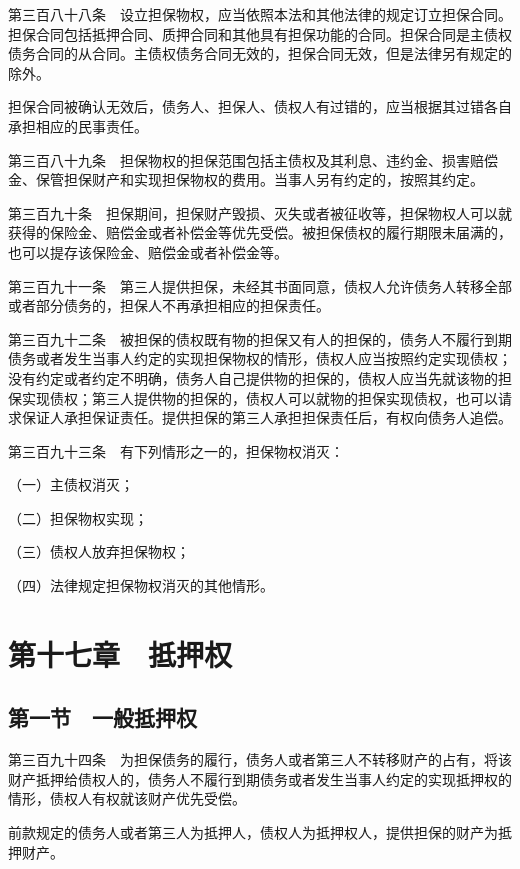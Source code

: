 \documentclass[UTF8,12pt,a4paper]{ctexbook}
\begin{document}
第三百八十八条　设立担保物权，应当依照本法和其他法律的规定订立担保合同。担保合同包括抵押合同、质押合同和其他具有担保功能的合同。担保合同是主债权债务合同的从合同。主债权债务合同无效的，担保合同无效，但是法律另有规定的除外。

担保合同被确认无效后，债务人、担保人、债权人有过错的，应当根据其过错各自承担相应的民事责任。

第三百八十九条　担保物权的担保范围包括主债权及其利息、违约金、损害赔偿金、保管担保财产和实现担保物权的费用。当事人另有约定的，按照其约定。

第三百九十条　担保期间，担保财产毁损、灭失或者被征收等，担保物权人可以就获得的保险金、赔偿金或者补偿金等优先受偿。被担保债权的履行期限未届满的，也可以提存该保险金、赔偿金或者补偿金等。

第三百九十一条　第三人提供担保，未经其书面同意，债权人允许债务人转移全部或者部分债务的，担保人不再承担相应的担保责任。

第三百九十二条　被担保的债权既有物的担保又有人的担保的，债务人不履行到期债务或者发生当事人约定的实现担保物权的情形，债权人应当按照约定实现债权；没有约定或者约定不明确，债务人自己提供物的担保的，债权人应当先就该物的担保实现债权；第三人提供物的担保的，债权人可以就物的担保实现债权，也可以请求保证人承担保证责任。提供担保的第三人承担担保责任后，有权向债务人追偿。

第三百九十三条　有下列情形之一的，担保物权消灭：

（一）主债权消灭；

（二）担保物权实现；

（三）债权人放弃担保物权；

（四）法律规定担保物权消灭的其他情形。

\section*{第十七章　抵押权}

\subsection*{第一节　一般抵押权}

第三百九十四条　为担保债务的履行，债务人或者第三人不转移财产的占有，将该财产抵押给债权人的，债务人不履行到期债务或者发生当事人约定的实现抵押权的情形，债权人有权就该财产优先受偿。

前款规定的债务人或者第三人为抵押人，债权人为抵押权人，提供担保的财产为抵押财产。
\end{document}
